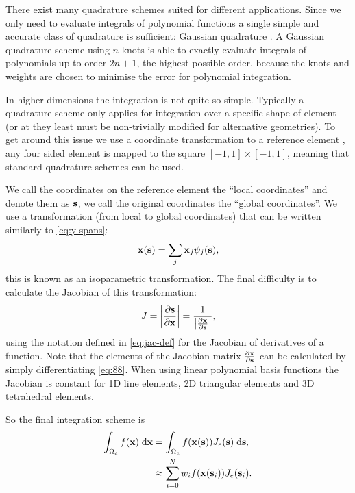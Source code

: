 There exist many quadrature schemes suited for different applications.
Since we only need to evaluate integrals of polynomial functions a single simple and accurate class of quadrature is sufficient: Gaussian quadrature \cite[492]{Kincaid2002}.
A Gaussian quadrature scheme using $n$ knots is able to exactly evaluate integrals of polynomials up to order $2n + 1$, the highest possible order, because the knots and weights are chosen to minimise the error for polynomial integration.

In higher dimensions the integration is not quite so simple.
Typically a quadrature scheme only applies for integration over a specific shape of element (or at they least must be non-trivially modified for alternative geometries).
To get around this issue we use a coordinate transformation to a reference element \cite[29]{HowardElmanDavidSilvester2006}, \eg any four sided element is mapped to the square $[-1, 1] \times [-1, 1]$, meaning that standard quadrature schemes can be used.

We call the coordinates on the reference element the ``local coordinates'' and denote them as $\sv$, we call the original coordinates the ``global coordinates''.
We use a transformation (from local to global coordinates) that can be written similarly to \cref{eq:y-spans}:
\begin{equation}
  \xv(\sv) = \sum_j \xv_j \sbf_j(\sv),
\label{eq:88}
\end{equation}
this is known as an isoparametric transformation.
The final difficulty is to calculate the Jacobian of this transformation:
\begin{equation}
  J = \abs{ \pd{\sv}{\xv}} = \frac{1}{\abs{\pd{\xv}{\sv}}},
\end{equation}
using the notation defined in \cref{eq:jac-def} for the Jacobian of derivatives of a function.
Note that the elements of the Jacobian matrix $\pd{\xv}{\sv}$ can be calculated by simply differentiating \cref{eq:88}.
When using linear polynomial basis functions the Jacobian is constant for 1D line elements, 2D triangular elements and 3D tetrahedral elements.

So the final integration scheme is
\begin{equation}
  \begin{aligned}
    \intdx[\magd_e]{f(\xv)} &= \intds[\magd_e]{f(\xv(\sv)) J_e(\sv)}, \\
    &\approx  \sum_{i=0}^N w_i f(\xv(\sv_i)) J_e(\sv_i).
  \end{aligned}
\end{equation}

